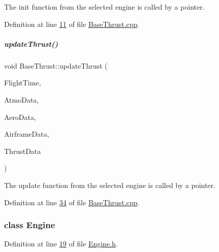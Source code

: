 The init function from the selected engine is called by a pointer. 

Definition at line \hyperlink{_base_thrust_8cpp_source_l00011}{11} of file \hyperlink{_base_thrust_8cpp_source}{Base\+Thrust.\+cpp}.

\mbox{\label{group___engine_a869359a1b2b7cddcbe5979d6a1cf5eac}} 
\subparagraph{\texorpdfstring{update\+Thrust()}{updateThrust()}}
{\footnotesize\ttfamily void Base\+Thrust\+::update\+Thrust (\begin{DoxyParamCaption}\item[{\hyperlink{group___tools_ga3f1431cb9f76da10f59246d1d743dc2c}{Float64}}]{Flight\+Time,  }\item[{Atmosphere\+Struct \&}]{Atmo\+Data,  }\item[{Aerodynamic\+Struct \&}]{Aero\+Data,  }\item[{Airframe\+Struct \&}]{Airframe\+Data,  }\item[{Thrust\+Struct \&}]{Thrust\+Data }\end{DoxyParamCaption})}

The update function from the selected engine is called by a pointer. 

Definition at line \hyperlink{_base_thrust_8cpp_source_l00034}{34} of file \hyperlink{_base_thrust_8cpp_source}{Base\+Thrust.\+cpp}.

\label{class_engine}
\subsubsection{class Engine}


Definition at line \hyperlink{_engine_8h_source_l00019}{19} of file \hyperlink{_engine_8h_source}{Engine.\+h}.

